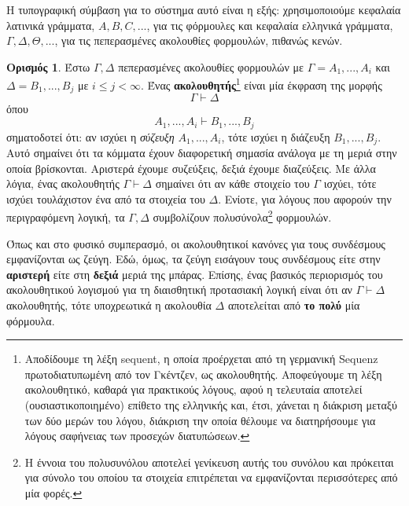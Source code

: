 \documentclass [a4paper,11pt] {book}
\theoremstyle{definition}
\theoremstyle{definition}
\newtheorem{definition}[theorem]{Ορισμός}
\begin{document}
Η τυπογραφική σύμβαση για το σύστημα αυτό είναι η εξής: χρησιμοποιούμε κεφαλαία λατινικά γράμματα, $A,B,C,...$, για τις φόρμουλες και κεφαλαία ελληνικά γράμματα, $\Gamma,\Delta,\Theta,...$, για τις πεπερασμένες ακολουθίες φορμουλών, πιθανώς κενών.
\begin{definition}
Έστω $\Gamma,\Delta$ πεπερασμένες ακολουθίες φορμουλών με $\Gamma=A_{1},...,A_{i}$ και $\Delta=B_{1},...,B_{j}$ με $i\leq j < \infty$. Ένας \textbf{ακολουθητής}\footnote{Αποδίδουμε τη λέξη sequent, η οποία προέρχεται από τη γερμανική Sequenz πρωτοδιατυπωμένη από τον Γκέντζεν, ως ακολουθητής. Αποφεύγουμε τη λέξη ακολουθητικό, καθαρά για πρακτικούς λόγους, αφού η τελευταία αποτελεί (ουσιαστικοποιημένο) επίθετο της ελληνικής και, έτσι, χάνεται η διάκριση μεταξύ των δύο μερών του λόγου, διάκριση την οποία θέλουμε να διατηρήσουμε για λόγους σαφήνειας των προσεχών διατυπώσεων.} είναι μία έκφραση της μορφής
\begin{equation*}
\Gamma \vdash \Delta
\end{equation*}
όπου
\begin{equation*}
A_{1},...,A_{i}\vdash B_{1},...,B_{j}
\end{equation*}
σηματοδοτεί ότι: αν ισχύει η \textit{σύζευξη} $A_{1},...,A_{i}$, τότε ισχύει η διάζευξη $B_{1},...,B_{j}$. Αυτό σημαίνει ότι τα κόμματα έχουν διαφορετική σημασία ανάλογα με τη μεριά στην οποία βρίσκονται. Αριστερά έχουμε συζεύξεις, δεξιά έχουμε διαζεύξεις. Με άλλα λόγια, ένας ακολουθητής $\Gamma \vdash \Delta$ σημαίνει ότι αν κάθε στοιχείο του $\Gamma$ ισχύει, τότε ισχύει τουλάχιστον ένα από τα στοιχεία του $\Delta$. Ενίοτε, για λόγους που αφορούν την περιγραφόμενη λογική, τα $\Gamma, \Delta$ συμβολίζουν πολυσύνολα\footnote{Η έννοια του πολυσυνόλου αποτελεί γενίκευση αυτής του συνόλου και πρόκειται για σύνολο του οποίου τα στοιχεία επιτρέπεται να εμφανίζονται περισσότερες από μία φορές.} φορμουλών. 
\end{definition}
Όπως και στο φυσικό συμπερασμό, οι ακολουθητικοί κανόνες για τους συνδέσμους εμφανίζονται ως ζεύγη. Εδώ, όμως, τα ζεύγη εισάγουν τους συνδέσμους είτε στην \textbf{αριστερή} είτε στη \textbf{δεξιά} μεριά της μπάρας. Επίσης, ένας βασικός περιορισμός του ακολουθητικού λογισμού για τη διαισθητική προτασιακή λογική είναι ότι αν $\Gamma\vdash\Delta$ ακολουθητής, τότε υποχρεωτικά η ακολουθία $\Delta$ αποτελείται από \textbf{το πολύ} μία φόρμουλα.
\end{document}

